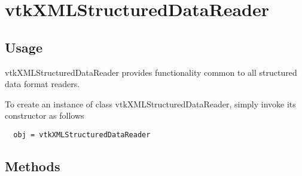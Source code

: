 \section{vtkXMLStructuredDataReader}

\subsection{Usage}

 vtkXMLStructuredDataReader provides functionality common to all
 structured data format readers.

To create an instance of class vtkXMLStructuredDataReader, simply
invoke its constructor as follows
\begin{verbatim}
  obj = vtkXMLStructuredDataReader
\end{verbatim}
\subsection{Methods}

